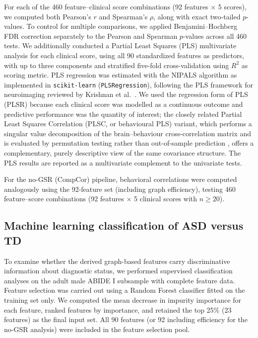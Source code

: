 \documentclass[10pt,letterpaper]{article}
\begin{document}
For each of the 460 feature--clinical score combinations (92 features $\times$ 5 scores), we
computed both Pearson's $r$ and Spearman's $\rho$, along with exact two-tailed $p$-values. To
control for multiple comparisons, we applied Benjamini--Hochberg FDR correction separately to
the Pearson and Spearman $p$-values across all 460 tests. We additionally conducted a Partial
Least Squares (PLS) multivariate analysis for each clinical score, using all 90 standardized
features as predictors, with up to three components and stratified five-fold cross-validation
using $R^2$ as scoring metric. PLS regression was estimated with the NIPALS algorithm as
implemented in \texttt{scikit-learn} (\texttt{PLSRegression}), following the PLS framework for
neuroimaging reviewed by Krishnan et al.\ \cite{Krishnan2011}. We used the regression form of PLS
(PLSR) because each clinical score was modelled as a continuous outcome and predictive performance
was the quantity of interest; the closely related Partial Least Squares Correlation (PLSC, or
behavioural PLS) variant, which performs a singular value decomposition of the brain--behaviour
cross-correlation matrix and is evaluated by permutation testing rather than out-of-sample
prediction \cite{Krishnan2011}, offers a complementary, purely descriptive view of the same
covariance structure. The PLS results are reported as a multivariate complement to the univariate
tests.

For the no-GSR (CompCor) pipeline, behavioral correlations were computed analogously using the
92-feature set (including graph efficiency), testing 460 feature--score combinations (92 features
$\times$ 5 clinical scores with $n \geq 20$).

\subsection*{Machine learning classification of ASD versus TD}

To examine whether the derived graph-based features carry discriminative information about
diagnostic status, we performed supervised classification analyses on the adult male ABIDE I
subsample with complete feature data. Feature selection was carried out using a Random Forest
classifier fitted on the training set only. We computed the mean decrease in impurity importance
for each feature, ranked features by importance, and retained the top 25\% (23 features) as the
final input set. All 90 features (or 92 including efficiency for the no-GSR analysis) were included
in the feature selection pool.
\end{document}
